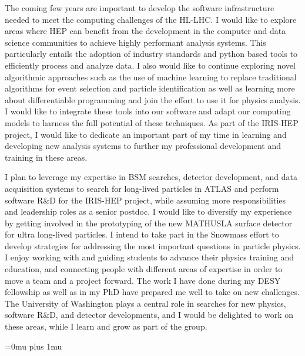 \documentclass[a4paper]{article}
\begin{document}
\bigskip

The coming few years are important to develop the software infrastructure needed to meet the computing challenges of the HL-LHC. I would like to explore areas where HEP can benefit from the development in the computer and data science communities to achieve highly performant analysis systems. This particularly entails the adoption of  industry standards and python based tools to efficiently process and analyze data. I also would like to continue exploring novel algorithmic approaches such as the use of machine learning to replace traditional algorithms for event selection and particle identification as well as learning more about differentiable programming and join the effort to use it for physics analysis. I would like to integrate these tools into our software and adapt our computing models to harness the full potential of these techniques. As part of the IRIS-HEP project, I would like to dedicate an important part of my time in learning and developing new analysis systems to further my professional development and training in these areas.

\bigskip

I plan to leverage my expertise in BSM searches, detector development, and data acquisition systems to search for long-lived particles in ATLAS and perform software R\&D for the IRIS-HEP project, while assuming more responsibilities and leadership roles as a senior postdoc. I would like to diversify my experience by getting involved in the prototyping of the new MATHUSLA surface detector for ultra long-lived particles. I intend to take part in the Snowmass effort to develop strategies for addressing the most important questions in particle physics. I enjoy working with and guiding students to advance their physics training and education, and connecting people with different areas of expertise in order to move a team and a project forward. The work I have done during my DESY fellowship as well as in my PhD have prepared me well to take on new challenges. The University of Washington plays a central role in searches for new physics, software R\&D, and detector developments, and I would be delighted to work on these areas, while I learn and grow as part of the group.




\Urlmuskip=0mu plus 1mu\relax
{%
\fontsize{11}{14}
\selectfont
}{}

\end{document}
